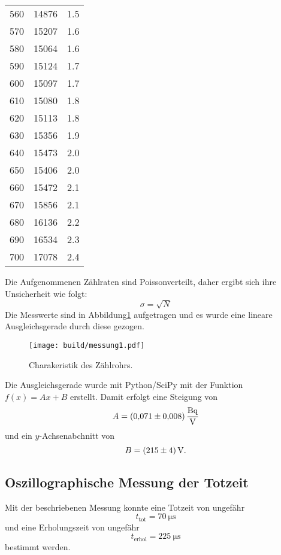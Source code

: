 \begin{table}
\begin{tabular}{S[table-format=3.0] S[table-format=5.0] S[table-format=1.2(0)e0]}
        560 & 14876 & 1.5 \\
        570 & 15207 & 1.6 \\
        580 & 15064 & 1.6 \\
        590 & 15124 & 1.7 \\
        600 & 15097 & 1.7 \\
        610 & 15080 & 1.8 \\
        620 & 15113 & 1.8 \\
        630 & 15356 & 1.9 \\
        640 & 15473 & 2.0 \\
        650 & 15406 & 2.0 \\
        660 & 15472 & 2.1 \\
        670 & 15856 & 2.1 \\
        680 & 16136 & 2.2 \\
        690 & 16534 & 2.3 \\
        700 & 17078 & 2.4 \\
        \bottomrule
    \end{tabular}
\end{table}
\noindent Die Aufgenommenen Zählraten sind Poissonverteilt, daher ergibt sich ihre Unsicherheit wie folgt:
\begin{equation}
  \sigma = \sqrt{N}
\end{equation}
Die Messwerte sind in Abbildung\ref{fig:plot} aufgetragen und es wurde eine lineare Ausgleichsgerade durch diese gezogen.
\begin{figure}[H]
  \centering
  \texttt{[image: build/messung1.pdf]}
  \caption{Charakeristik des Zählrohrs.}
  \label{fig:plot}
\end{figure}
\noindent  Die Ausgleichsgerade wurde mit Python/SciPy mit der Funktion $f(x)= Ax + B$ erstellt.
Damit erfolgt eine Steigung von
\begin{equation}
  A = \SI{0.071 \pm 0.008}{\becquerel\per\volt}
\end{equation}
und ein $y$-Achsenabchnitt von
\begin{equation}
  B =   \SI[per-mode=reciprocal]{215\pm 4}{\volt}        .
\end{equation}
\subsection{Oszillographische Messung der Totzeit}
Mit der beschriebenen Messung konnte eine Totzeit von ungefähr
\begin{equation*}
  t_\text{tot} = \SI{70}{\micro \second}
\end{equation*}
und eine Erholungszeit von ungefähr
\begin{equation*}
    t_\text{erhol} = \SI{225}{\micro\second}
\end{equation*}
bestimmt werden.
